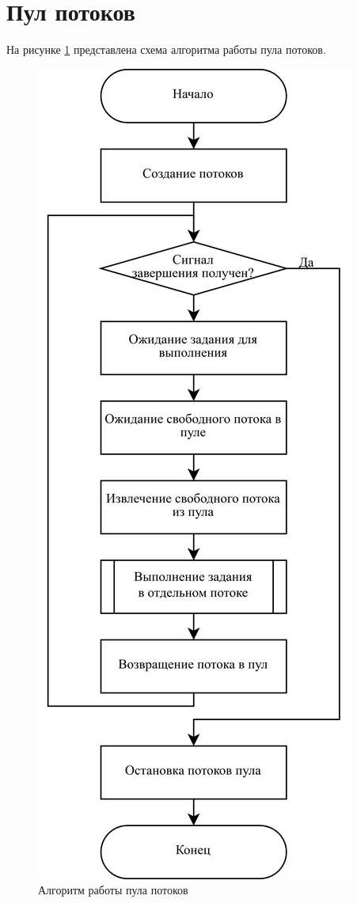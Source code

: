 \section{Пул потоков}

На рисунке \ref{fig:pool} представлена схема алгоритма работы пула потоков.

\begin{figure}[H]
	\centering
	\includegraphics[scale=0.2]{assets/thread_pool.png}
	\caption{Алгоритм работы пула потоков}
	\label{fig:pool}
\end{figure}
